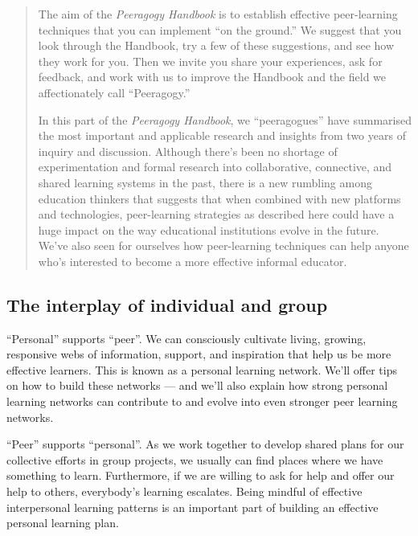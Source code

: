 \begin{quote}
The aim of the \emph{Peeragogy Handbook} is to establish effective
peer-learning techniques that you can implement ``on the ground.'' We
suggest that you look through the Handbook, try a few of these
suggestions, and see how they work for you. Then we invite you share
your experiences, ask for feedback, and work with us to improve the
Handbook and the field we affectionately call ``Peeragogy.''

In this part of the \emph{Peeragogy Handbook}, we ``peeragogues'' have
summarised the most important and applicable research and insights from
two years of inquiry and discussion. Although there's been no shortage
of experimentation and formal research into collaborative, connective,
and shared learning systems in the past, there is a new rumbling among
education thinkers that suggests that when combined with new platforms
and technologies, peer-learning strategies as described here could have
a huge impact on the way educational institutions evolve in the future.
We've also seen for ourselves how peer-learning techniques can help
anyone who's interested to become a more effective informal educator.
\end{quote}


\subsection{The interplay of individual and group}

``Personal'' supports ``peer''. We can consciously cultivate living,
growing, responsive webs of information, support, and inspiration that
help us be more effective learners. This is known as a personal learning
network. We'll offer tips on how to build these networks --- and we'll
also explain how strong personal learning networks can contribute to and
evolve into even stronger peer learning networks.

``Peer'' supports ``personal''. As we work together to develop shared
plans for our collective efforts in group projects, we usually can find
places where we have something to learn. Furthermore, if we are willing
to ask for help and offer our help to others, everybody's learning
escalates. Being mindful of effective interpersonal learning patterns is
an important part of building an effective personal learning plan.


